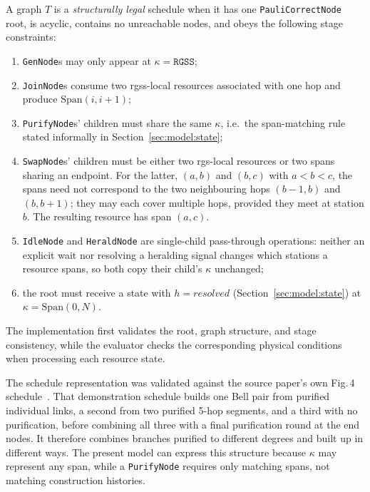 A graph $T$ is a \emph{structurally legal} schedule when it has one \texttt{PauliCorrectNode} root, is acyclic, contains no unreachable nodes, and obeys the following stage constraints:
\begin{enumerate}
    \item[(i)] \texttt{GenNode}s may only appear at $\kappa = \mathtt{RGSS}$;
    \item[(ii)] \texttt{JoinNode}s consume two \Gls{rgss}-local resources associated with one hop and produce $\mathrm{Span}(i,i{+}1)$;
    \item[(iii)] \texttt{PurifyNode}s' children must share the same $\kappa$, i.e.\ the span-matching rule stated informally in Section~\ref{sec:model:state};
    \item[(iv)] \texttt{SwapNode}s' children must be either two \Gls{rgs}-local resources or two spans sharing an endpoint. For the latter, $(a,b)$ and $(b,c)$ with $a<b<c$, the spans need not correspond to the two neighbouring hops $(b-1,b)$ and $(b,b+1)$; they may each cover multiple hops, provided they meet at station $b$. The resulting resource has span $(a,c)$.
    \item[(v)] \texttt{IdleNode} and \texttt{HeraldNode} are single-child pass-through operations: neither an explicit wait nor resolving a heralding signal changes which stations a resource spans, so both copy their child's $\kappa$ unchanged;
    \item[(vi)] the root must receive a state with $h=\mathit{resolved}$ (Section~\ref{sec:model:state}) at $\kappa=\mathrm{Span}(0,N)$.
\end{enumerate}
The implementation first validates the root, graph structure, and stage consistency, while the evaluator checks the corresponding physical conditions when processing each resource state.

The schedule representation was validated against the source paper's own Fig.\,4 schedule~\cite{Benchasattabuse2025Integrating}. That demonstration schedule builds one Bell pair from purified individual links, a second from two purified 5-hop segments, and a third with no purification, before combining all three with a final purification round at the end nodes. It therefore combines branches purified to different degrees and built up in different ways. The present model can express this structure because $\kappa$ may represent any span, while a \texttt{PurifyNode} requires only matching spans, not matching construction histories.

\vspace{1.3cm}

